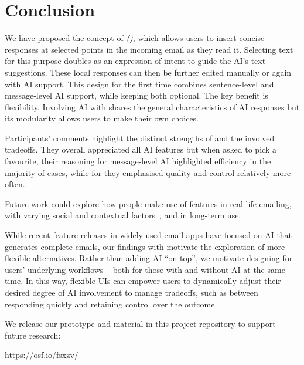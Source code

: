 \section{Conclusion}\label{sec:conclusion}

We have proposed the concept of \textit{\modeoursTXT{} (\modeours)}, which %
allows users to insert concise responses at selected points in the incoming email as they read it. Selecting text for this purpose doubles as an expression of intent to guide the AI's text suggestions. These local responses can then be further edited manually or again with AI support. This design for the first time combines sentence-level and message-level AI support, while keeping both optional.
The key benefit is flexibility. Involving AI with \modeours{} shares the general characteristics of AI responses but its modularity allows users to make their own choices. %

Participants' comments highlight the distinct strengths of \modeours{} and the involved tradeoffs. They overall appreciated all AI features but when asked to pick a favourite, their reasoning for message-level AI highlighted efficiency in the majority of cases, while for \modeours{} they emphasised quality and control relatively more often.

Future work could explore how people make use of \modeours{} features in real life emailing, with varying social and contextual factors~\cite{Robertson2021cantreply}, and in long-term use.

While recent feature releases in widely used email apps have focused on AI that generates complete emails, our findings with \modeours{} motivate the exploration of more flexible alternatives. Rather than adding AI ``on top'', we motivate designing for users' underlying workflows -- both for those with and without AI at the same time. In this way, flexible UIs can empower users to dynamically adjust their desired degree of AI involvement to manage tradeoffs, such as between responding quickly and retaining control over the outcome.

We release our prototype and  material in this project repository to support future research:

\url{https://osf.io/fsxzv/}
